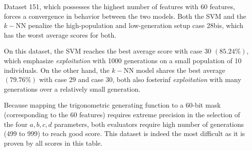 \documentclass[12pt, openany]{article}
\begin{document}
Dataset 151, which possesses the highest number of features with 60 features, forces a convergence in behavior between the two models. Both the SVM and the $k-$NN penalize the high-population and low-generation setup case 28bis, which has the worst average scores for both.

On this dataset, the SVM reaches the best average score with case 30 $(85.24\%)$, which emphasize \emph{exploitation} with 1000 generations on a small population of 10 individuals. On the other hand, the $k-$NN model shares the best average $(79.76\%)$ with case 29 and case 30, both also fosterinf \emph{exploitation} with many generations over a relatively small generation.

Because mapping the trigonometric generating function to a 60-bit mask (corresponding to the 60 features) requires extreme precision in the selection of the four $a,b,c,d$ parameters, both evaluators require high number of generations (499 to 999) to reach good score. This dataset is indeed the most difficult as it is proven by all scores in this table.
\end{document}

